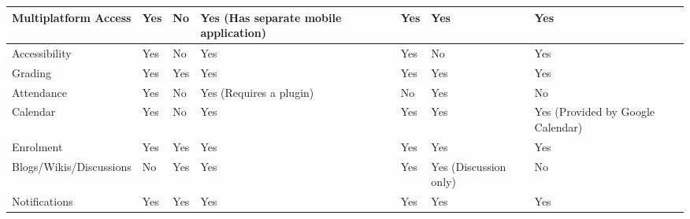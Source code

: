 \begin{table}[ht]
{\begin{tabular}{llllllll}
        \multicolumn{1}{|l|}{Multiplatform Access}        & \multicolumn{1}{l|}{Yes} & \multicolumn{1}{l|}{No} & \multicolumn{1}{l|}{Yes (Has separate mobile application)} & \multicolumn{1}{l|}{} & \multicolumn{1}{l|}{Yes}                       & \multicolumn{1}{l|}{Yes} & \multicolumn{1}{l|}{Yes} \\ \hline
        \multicolumn{1}{|l|}{Accessibility}               & \multicolumn{1}{l|}{Yes} & \multicolumn{1}{l|}{No} & \multicolumn{1}{l|}{Yes} & \multicolumn{1}{l|}{} & \multicolumn{1}{l|}{Yes}                       & \multicolumn{1}{l|}{No} & \multicolumn{1}{l|}{Yes} \\ \hline
        \multicolumn{1}{|l|}{Grading}                     & \multicolumn{1}{l|}{Yes} & \multicolumn{1}{l|}{Yes} & \multicolumn{1}{l|}{Yes} & \multicolumn{1}{l|}{} & \multicolumn{1}{l|}{Yes}                       & \multicolumn{1}{l|}{Yes} & \multicolumn{1}{l|}{Yes} \\ \hline
        \multicolumn{1}{|l|}{Attendance}                  & \multicolumn{1}{l|}{Yes} & \multicolumn{1}{l|}{No} & \multicolumn{1}{l|}{Yes (Requires a plugin)} & \multicolumn{1}{l|}{} & \multicolumn{1}{l|}{No}                        & \multicolumn{1}{l|}{Yes} & \multicolumn{1}{l|}{No} \\ \hline
        \multicolumn{1}{|l|}{Calendar}                    & \multicolumn{1}{l|}{Yes} & \multicolumn{1}{l|}{No} & \multicolumn{1}{l|}{Yes} & \multicolumn{1}{l|}{} & \multicolumn{1}{l|}{Yes}                       & \multicolumn{1}{l|}{Yes} & \multicolumn{1}{l|}{Yes (Provided by Google Calendar)} \\ \hline
        \multicolumn{1}{|l|}{Enrolment}                   & \multicolumn{1}{l|}{Yes} & \multicolumn{1}{l|}{Yes} & \multicolumn{1}{l|}{Yes} & \multicolumn{1}{l|}{} & \multicolumn{1}{l|}{Yes}                       & \multicolumn{1}{l|}{Yes} & \multicolumn{1}{l|}{Yes} \\ \hline
        \multicolumn{1}{|l|}{Blogs/Wikis/Discussions}     & \multicolumn{1}{l|}{No} & \multicolumn{1}{l|}{Yes} & \multicolumn{1}{l|}{Yes} & \multicolumn{1}{l|}{} & \multicolumn{1}{l|}{Yes}                       & \multicolumn{1}{l|}{Yes (Discussion only)} & \multicolumn{1}{l|}{No} \\ \hline
        \multicolumn{1}{|l|}{Notifications}               & \multicolumn{1}{l|}{Yes} & \multicolumn{1}{l|}{Yes} & \multicolumn{1}{l|}{Yes} & \multicolumn{1}{l|}{} & \multicolumn{1}{l|}{Yes}                       & \multicolumn{1}{l|}{Yes} & \multicolumn{1}{l|}{Yes} \\ \hline

\end{tabular}}
\end{table}
